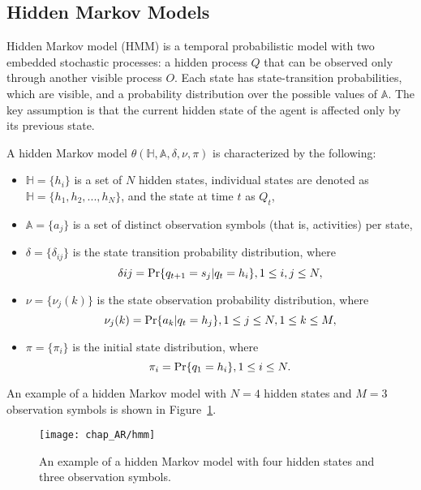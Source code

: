 \subsection{Hidden Markov Models} 
\label{sec:ar:hmm}

Hidden Markov model (HMM) is a temporal probabilistic model with two embedded stochastic processes: a hidden process $Q$ that can be observed only through another visible process $O$. Each state has state-transition probabilities, which are visible, and a probability distribution over the possible values of $\mathbb{A}$. The key assumption is that the current hidden state of the agent is affected only by its previous state.  

A hidden Markov model $\theta(\mathbb{H}, \mathbb{A}, \delta, \nu, \pi)$ is characterized by the following:
\begin{itemize}
	\item $\mathbb{H}=\{h_i\}$ is a set of $N$ hidden states, individual states are denoted as $\mathbb{H}=\{h_1, h_2, ..., h_N\}$, and the state at time $t$ as $Q_t$,
	\item $\mathbb{A} = \{a_j\}$ is a set of distinct observation symbols (that is, activities) per state,
	\item $\delta = \{\delta_{ij}\}$ is the state transition probability distribution, where 
		\begin{equation}
			\label{eq:hmm-a}
			\delta{ij} = \text{Pr}\{q_{t+1} = s_j | q_t = h_i\}, 1 \leq i,j \leq N,
			\end{equation}
	\item $\nu = \{\nu_{j}(k)\}$ is the state observation probability distribution, where 
			\begin{equation}
			\label{eq:hmm-b}
			\nu_{j}(k) = \text{Pr}\{a_k | q_t = h_j\}, 1 \leq j \leq N, 1 \leq k \leq M, 
			\end{equation}
	\item $\pi=\{\pi_i\}$ is the initial state distribution, where
			\begin{equation}
			\label{eq:hmm-pi}
			\pi_i = \text{Pr}\{q_1 = h_i\}, 1 \leq i \leq N.
			\end{equation}
\end{itemize}
\noindent An example of a hidden Markov model with $N=4$ hidden states and $M=3$ observation symbols is shown in Figure~\ref{fig:hmm}. 

\begin{figure}[!h]
\centering
\texttt{[image: chap\_AR/hmm]}
\caption{An example of a hidden Markov model with four hidden states and three observation symbols.}
\label{fig:hmm}
\end{figure}

